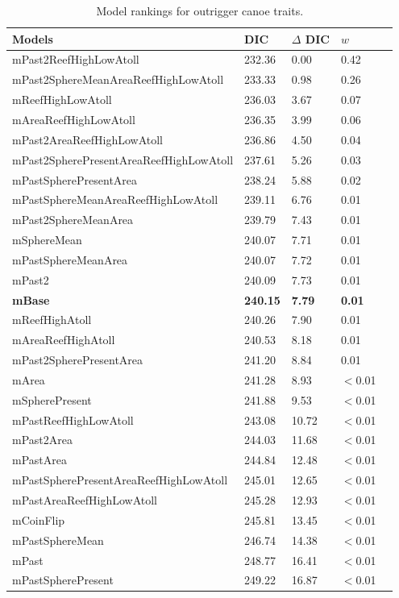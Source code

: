\begin{table}
\begin{center}
\begin{tabular}{lllll}
Models & DIC & $\Delta$ DIC & $w$\\
\hline
mPast2ReefHighLowAtoll & 232.36 & 0.00 & 0.42\\
mPast2SphereMeanAreaReefHighLowAtoll & 233.33 & 0.98 & 0.26\\
mReefHighLowAtoll & 236.03 & 3.67 & 0.07\\
mAreaReefHighLowAtoll & 236.35 & 3.99 & 0.06\\
mPast2AreaReefHighLowAtoll & 236.86 & 4.50 & 0.04\\
mPast2SpherePresentAreaReefHighLowAtoll & 237.61 & 5.26 & 0.03\\
mPastSpherePresentArea & 238.24 & 5.88 & 0.02\\
mPastSphereMeanAreaReefHighLowAtoll & 239.11 & 6.76 & 0.01\\
mPast2SphereMeanArea & 239.79 & 7.43 & 0.01\\
mSphereMean & 240.07 & 7.71 & 0.01\\
mPastSphereMeanArea & 240.07 & 7.72 & 0.01\\
mPast2 & 240.09 & 7.73 & 0.01\\
\textbf{mBase} & \textbf{240.15} & \textbf{7.79} & \textbf{0.01}\\
mReefHighAtoll & 240.26 & 7.90 & 0.01\\
mAreaReefHighAtoll & 240.53 & 8.18 & 0.01\\
mPast2SpherePresentArea & 241.20 & 8.84 & 0.01\\
mArea & 241.28 & 8.93 & $<$0.01\\
mSpherePresent & 241.88 & 9.53 & $<$0.01\\
mPastReefHighLowAtoll & 243.08 & 10.72 & $<$0.01\\
mPast2Area & 244.03 & 11.68 & $<$0.01\\
mPastArea & 244.84 & 12.48 & $<$0.01\\
mPastSpherePresentAreaReefHighLowAtoll & 245.01 & 12.65 & $<$0.01\\
mPastAreaReefHighLowAtoll & 245.28 & 12.93 & $<$0.01\\
mCoinFlip & 245.81 & 13.45 & $<$0.01\\
mPastSphereMean & 246.74 & 14.38 & $<$0.01\\
mPast & 248.77 & 16.41 & $<$0.01\\
mPastSpherePresent & 249.22 & 16.87 & $<$0.01\\
\end{tabular}
\end{center}
\caption{Model rankings for outrigger canoe traits.
\label{resultstable5}}
\end{table}

